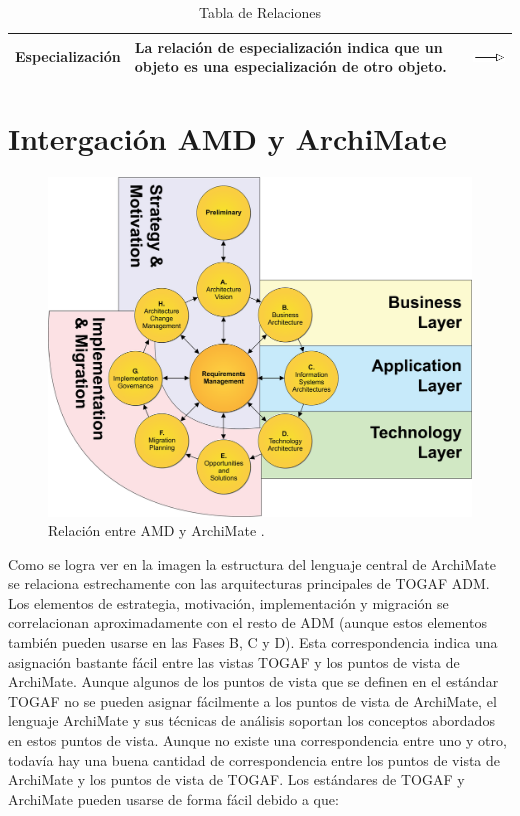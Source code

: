 \begin{table}[H]
\begin{tabular}{| m{4cm} | m{4cm} | m{4cm} | }
		\hline
		\centering\vspace{1.52mm}Especialización& \vspace{1.52mm}La relación de especialización indica que un objeto es una especialización de otro objeto.& \vspace{1.52mm}\includegraphics[width=20mm]{arquitectura/imagenes/412} \\
		\hline
	\end{tabular}
	\caption{Tabla de Relaciones}
	\label{fig:relaciones}
\end{table}


\section{Intergación AMD y ArchiMate}

\begin{figure}[h]
	\centering
	\includegraphics[width=0.7\linewidth]{arquitectura/imagenes/AMD_ArchiMate}
	\caption{Relación entre AMD y ArchiMate \cite{togaf3}.}
	\label{fig:amdarchimate}
\end{figure}


Como se logra ver en la imagen la estructura del lenguaje central de ArchiMate se relaciona estrechamente con las arquitecturas principales de TOGAF ADM. Los elementos de estrategia, motivación, implementación y migración se correlacionan aproximadamente con el resto de ADM (aunque estos elementos también pueden usarse en las Fases B, C y D). Esta correspondencia indica una asignación bastante fácil entre las vistas TOGAF y los puntos de vista de ArchiMate.
\newline
Aunque algunos de los puntos de vista que se definen en el estándar TOGAF no se pueden asignar fácilmente a los puntos de vista de ArchiMate, el lenguaje ArchiMate y sus técnicas de análisis soportan los conceptos abordados en estos puntos de vista. Aunque no existe una correspondencia entre uno y otro, todavía hay una buena cantidad de correspondencia entre los puntos de vista de ArchiMate y los puntos de vista de TOGAF.
\newline
Los estándares de TOGAF y ArchiMate pueden usarse de forma fácil debido a que:


